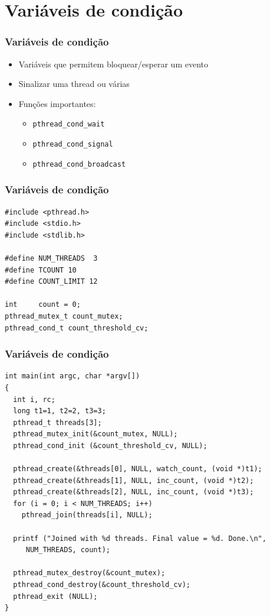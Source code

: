\documentclass[xcolor=dvipsnames,11pt,presentation,aspectratio=169]{beamer}
\begin{document}
\section{Variáveis de condição}
\begin{frame}
  \frametitle{Variáveis de condição}
  \begin{itemize}
  \item Variáveis que permitem bloquear/esperar um evento
  \item Sinalizar uma thread ou várias
  \item Funções importantes:
  \begin{itemize}
    \item \texttt{pthread\_cond\_wait}
    \item \texttt{pthread\_cond\_signal}
    \item \texttt{pthread\_cond\_broadcast}
  \end{itemize}
  \end{itemize}
\end{frame}
\begin{frame}[fragile]
  \frametitle{Variáveis de condição}
  \vspace{-5mm}
\begin{lstlisting}
#include <pthread.h>
#include <stdio.h>
#include <stdlib.h>
  
#define NUM_THREADS  3
#define TCOUNT 10
#define COUNT_LIMIT 12
  
int     count = 0;
pthread_mutex_t count_mutex;
pthread_cond_t count_threshold_cv;  
\end{lstlisting}
\end{frame}
\begin{frame}[fragile]
  \frametitle{Variáveis de condição}
  \vspace{-5mm}
\begin{lstlisting}
int main(int argc, char *argv[])
{
  int i, rc; 
  long t1=1, t2=2, t3=3;
  pthread_t threads[3];
  pthread_mutex_init(&count_mutex, NULL);
  pthread_cond_init (&count_threshold_cv, NULL);

  pthread_create(&threads[0], NULL, watch_count, (void *)t1);
  pthread_create(&threads[1], NULL, inc_count, (void *)t2);
  pthread_create(&threads[2], NULL, inc_count, (void *)t3);
  for (i = 0; i < NUM_THREADS; i++) 
    pthread_join(threads[i], NULL);

  printf ("Joined with %d threads. Final value = %d. Done.\n", 
     NUM_THREADS, count);
  
  pthread_mutex_destroy(&count_mutex);
  pthread_cond_destroy(&count_threshold_cv);
  pthread_exit (NULL);
}
\end{lstlisting}
\end{frame}
\end{document}
